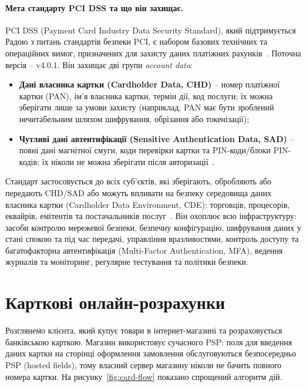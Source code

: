 \paragraph{Мета стандарту PCI DSS та що він захищає.}
PCI DSS (Payment Card Industry Data Security Standard), який підтримується Радою з питань стандартів безпеки PCI, 
є набором базових технічних та операційних вимог, призначених для захисту даних платіжних рахунків~\cite{pci_dss}. 
Поточна версія -- v4.0.1. Він захищає дві групи \emph{account data}:
\begin{itemize}[noitemsep]
    \item \textbf{Дані власника картки (Cardholder Data, CHD)} -- номер платіжної картки (PAN), ім'я власника картки, 
        термін дії, код послуги; їх можна зберігати лише за умови захисту (наприклад, PAN має бути зроблений нечитабельним 
        шляхом шифрування, обрізання або токенізації);
    \item \textbf{Чутливі дані автентифікації (Sensitive Authentication Data, SAD)} -- повні дані магнітної смуги, 
        коди перевірки картки та PIN-коди/блоки PIN-кодів; їх ніколи не можна зберігати після авторизації~\cite{pci_faq_1210}.
\end{itemize}
Стандарт застосовується до всіх суб'єктів, які зберігають, обробляють або передають CHD/SAD або можуть впливати на 
безпеку середовища даних власника картки (Cardholder Data Environment, CDE): торговців, процесорів, еквайрів, 
емітентів та постачальників послуг~\cite{pci_dss}. Він охоплює всю інфраструктуру: засоби контролю мережевої 
безпеки, безпечну конфігурацію, шифрування даних у стані спокою та під час передачі, управління вразливостями, 
контроль доступу та багатофакторна автентифікація (Multi-Factor Authentication, MFA), ведення журналів та 
моніторинг, регулярне тестування та політики безпеки.

\section{Карткові онлайн-розрахунки}
\label{sec:flow}
Розглянемо клієнта, який купує товари в інтернет-магазині та розраховується банківською карткою. Магазин
використовує сучасного PSP: поля для введення даних картки на сторінці оформлення замовлення
обслуговуються безпосередньо PSP (hosted fields), тому власний сервер магазину ніколи не бачить повного
номера картки. На рисунку~\ref{fig:card-flow} показано спрощений алгоритм дій.

